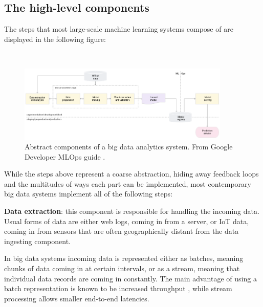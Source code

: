 

\subsection{The high-level components}


The steps that most large-scale machine learning systems compose of are displayed in the following figure: 

\begin{figure}[ht]
\ \newline
\begin{center}
\includegraphics[width=0.9\textwidth]{simplegoogle.png}
\caption{Abstract components of a big data analytics system. From Google Developer MLOps guide \cite{googlemlops}.}
\label{simplepipeline}
\end{center}
\end{figure}


While the steps above represent a coarse abstraction, hiding away feedback loops and the multitudes of ways each part can be implemented, most contemporary big data systems implement all of the following steps:

\textbf{Data extraction}: this component is responsible for handling the incoming data. Usual forms of data are either web logs, coming in from a server, or IoT data, coming in from sensors that are often geographically distant from the data ingesting component.

In big data systems incoming data is represented either as batches, meaning chunks of data coming in at certain intervals, or as a stream, meaning that individual data records are coming in constantly. The main advantage of using a batch representation is known to be increased throughput%
, while stream processing allows smaller end-to-end latencies. %

